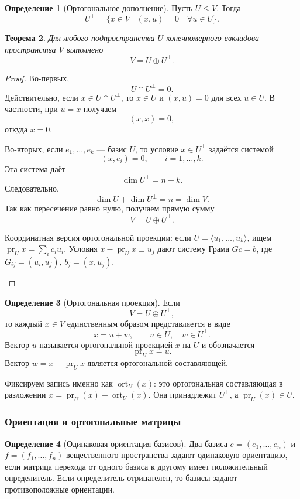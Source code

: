 \documentclass[12pt,a4paper]{article}
\theoremstyle{definition}
\newtheorem{definition}{Определение}[section]
\theoremstyle{plain}
\newtheorem{theorem}[definition]{Теорема}
\theoremstyle{remark}
\newenvironment{knowledgefix}{\begin{clarifybox}}{\end{clarifybox}}
\newcommand{\pr}{\operatorname{pr}}
\newcommand{\ort}{\operatorname{ort}}
\begin{document}
\begin{definition}[Ортогональное дополнение]
Пусть $U\le V$. Тогда
\[
    U^\perp=\{x\in V\mid (x,u)=0\quad \forall u\in U\}.
\]
\end{definition}

\begin{theorem}
Для любого подпространства $U$ конечномерного евклидова пространства $V$ выполнено
\[
    V=U\oplus U^\perp.
\]
\end{theorem}

\begin{proof}
Во-первых,
\[
    U\cap U^\perp=0.
\]
Действительно, если $x\in U\cap U^\perp$, то $x\in U$ и $(x,u)=0$ для всех $u\in U$.
В частности, при $u=x$ получаем
\[
    (x,x)=0,
\]
откуда $x=0$.

Во-вторых, если $e_1,\ldots,e_k$ --- базис $U$, то условие $x\in U^\perp$ задаётся системой
\[
    (x,e_i)=0,
    \qquad i=1,\ldots,k.
\]
Эта система даёт
\[
    \dim U^\perp=n-k.
\]
Следовательно,
\[
    \dim U+\dim U^\perp=n=\dim V.
\]
Так как пересечение равно нулю, получаем прямую сумму
\[
    V=U\oplus U^\perp.
\]
\begin{knowledgefix}
Координатная версия ортогональной проекции: если \(U=\langle u_1,
\ldots,u_k\rangle\), ищем \(\pr_U x=\sum_i c_i u_i\). Условия \(x-\pr_U x\perp u_j\) дают систему Грама \(Gc=b\), где \(G_{ij}=(u_i,u_j)\), \(b_j=(x,u_j)\).
\end{knowledgefix}
\end{proof}

\begin{definition}[Ортогональная проекция]
Если
\[
    V=U\oplus U^\perp,
\]
то каждый $x\in V$ единственным образом представляется в виде
\[
    x=u+w,
    \qquad u\in U,
    \quad w\in U^\perp.
\]
Вектор $u$ называется ортогональной проекцией $x$ на $U$ и обозначается
\[
    \pr_U x=u.
\]
Вектор $w=x-\pr_Ux$ является ортогональной составляющей.
\begin{knowledgefix}
Фиксируем запись именно как \(\ort_U(x)\): это ортогональная составляющая в разложении \(x=\pr_U(x)+\ort_U(x)\). Она принадлежит \(U^\perp\), а \(\pr_U(x)\in U\).
\end{knowledgefix}
\end{definition}

\subsubsection{Ориентация и ортогональные матрицы}


\begin{definition}[Одинаковая ориентация базисов]
Два базиса $e=(e_1,\ldots,e_n)$ и $f=(f_1,\ldots,f_n)$ вещественного пространства задают одинаковую ориентацию, если матрица перехода от одного базиса к другому имеет положительный определитель.
Если определитель отрицателен, то базисы задают противоположные ориентации.
\end{definition}
\end{document}
